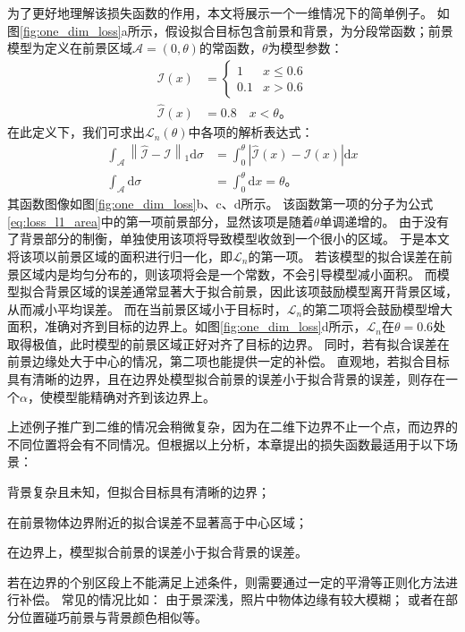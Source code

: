 为了更好地理解该损失函数的作用，本文将展示一个一维情况下的简单例子。
如图\ref{fig:one_dim_loss}a所示，假设拟合目标包含前景和背景，为分段常函数；前景模型为定义在前景区域$\mathcal{A}=(0,\theta)$的常函数，$\theta$为模型参数：
\begin{align}
\mathcal{I}(x) &= \begin{cases}
    1   & x \leq 0.6 \\
    0.1 & x > 0.6
\end{cases}\\
\hat{\mathcal{I}}(x) &= 0.8 \quad x < \theta
\text{。}
\end{align}
在此定义下，我们可求出$\mathcal{L}_n(\theta)$中各项的解析表达式：
\begin{align}
\int_{\mathcal{A}} \left\| \hat{\mathcal{I}} - \mathcal{I} \right\|_1 \mathrm{d}\sigma
&= \int_0^{\theta} \left| \hat{\mathcal{I}}(x) - \mathcal{I}(x) \right| \mathrm{d}x \\
\int_{\mathcal{A}}\mathrm{d}\sigma &= \int_0^{\theta} \mathrm{d}x = \theta
\text{。}
\end{align}
其函数图像如图\ref{fig:one_dim_loss}b、c、d所示。
该函数第一项的分子为公式\ref{eq:loss_l1_area}中的第一项前景部分，显然该项是随着$\theta$单调递增的。
由于没有了背景部分的制衡，单独使用该项将导致模型收敛到一个很小的区域。
于是本文将该项以前景区域的面积进行归一化，即$\mathcal{L}_n$的第一项。
若该模型的拟合误差在前景区域内是均匀分布的，则该项将会是一个常数，不会引导模型减小面积。
而模型拟合背景区域的误差通常显著大于拟合前景，因此该项鼓励模型离开背景区域，从而减小平均误差。
而在当前景区域小于目标时，$\mathcal{L}_n$的第二项将会鼓励模型增大面积，准确对齐到目标的边界上。如图\ref{fig:one_dim_loss}d所示，$\mathcal{L}_n$在$\theta=0.6$处取得极值，此时模型的前景区域正好对齐了目标的边界。
同时，若有拟合误差在前景边缘处大于中心的情况，第二项也能提供一定的补偿。
直观地，若拟合目标具有清晰的边界，且在边界处模型拟合前景的误差小于拟合背景的误差，则存在一个$\alpha$，使模型能精确对齐到该边界上。

上述例子推广到二维的情况会稍微复杂，因为在二维下边界不止一个点，而边界的不同位置将会有不同情况。但根据以上分析，本章提出的损失函数最适用于以下场景：
\begin{enumerate*}
    \item 背景复杂且未知，但拟合目标具有清晰的边界；
    \item 在前景物体边界附近的拟合误差不显著高于中心区域；
    \item 在边界上，模型拟合前景的误差小于拟合背景的误差。
\end{enumerate*}
若在边界的个别区段上不能满足上述条件，则需要通过一定的平滑等正则化方法进行补偿。
常见的情况比如：
由于景深浅，照片中物体边缘有较大模糊；
或者在部分位置碰巧前景与背景颜色相似等。

